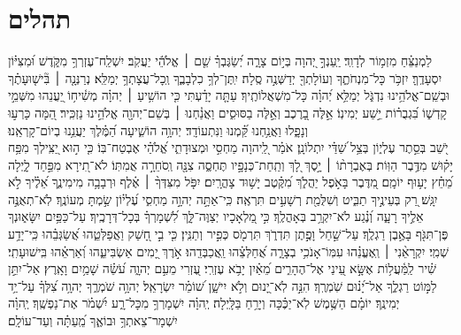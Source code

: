 \documentclass[a4paper, twoside, openany, parskip=half, 10pt]{article}
\begin{document}
\section{תהלים}

לַמְנַצֵּ֗חַ מִזְמ֥וֹר לְדָוִֽד׃
יַֽעַנְךָ֣ יְ֭הוָה בְּי֣וֹם צָרָ֑ה יְ֝שַׂגֶּבְךָ֗ שֵׁ֤ם ׀ אֱלֹהֵ֬י יַעֲקֹֽב׃
יִשְׁלַֽח־עֶזְרְךָ֥ מִקֹּ֑דֶשׁ וּ֝מִצִּיּ֗וֹן יִסְעָדֶֽךָּ׃
יִזְכֹּ֥ר כָּל־מִנְחֹתֶ֑ךָ וְעוֹלָתְךָ֖ יְדַשְּׁנֶ֣ה סֶֽלָה׃
יִֽתֶּן־לְךָ֥ כִלְבָבֶ֑ךָ וְֽכָל־עֲצָתְךָ֥ יְמַלֵּֽא׃
נְרַנְּנָ֤ה ׀ בִּ֘ישׁ֤וּעָתֶ֗ךָ וּבְשֵֽׁם־אֱלֹהֵ֥ינוּ נִדְגֹּ֑ל יְמַלֵּ֥א יְ֝הוָ֗ה כָּל־מִשְׁאֲלוֹתֶֽיךָ׃
עַתָּ֤ה יָדַ֗עְתִּי כִּ֤י הוֹשִׁ֥יעַ ׀ יְהוָ֗ה מְשִׁ֫יח֥וֹ יַ֭עֲנֵהוּ מִשְּׁמֵ֣י קָדְשׁ֑וֹ בִּ֝גְבֻר֗וֹת יֵ֣שַׁע יְמִינֽוֹ׃
אֵ֣לֶּה בָ֭רֶכֶב וְאֵ֣לֶּה בַסּוּסִ֑ים וַאֲנַ֓חְנוּ ׀ בְּשֵׁם־יְהוָ֖ה אֱלֹהֵ֣ינוּ נַזְכִּֽיר׃
הֵ֭מָּה כָּרְע֣וּ וְנָפָ֑לוּ וַאֲנַ֥חְנוּ קַּ֝֗מְנוּ וַנִּתְעוֹדָֽד׃
יְהוָ֥ה הוֹשִׁ֑יעָה הַ֝מֶּ֗לֶךְ יַעֲנֵ֥נוּ בְיוֹם־קָרְאֵֽנוּ׃\\

יֹ֭שֵׁב בְּסֵ֣תֶר עֶלְי֑וֹן בְּצֵ֥ל שַׁ֝דַּ֗י יִתְלוֹנָֽן׃
אֹמַ֗ר לַֽ֭יהוָה מַחְסִ֣י וּמְצוּדָתִ֑י אֱ֝לֹהַ֗י אֶבְטַח־בּֽוֹ׃
כִּ֤י ה֣וּא יַ֭צִּֽילְךָ מִפַּ֥ח יָק֗וּשׁ מִדֶּ֥בֶר הַוּֽוֹת׃
בְּאֶבְרָת֨וֹ ׀ יָ֣סֶךְ לָ֭ךְ וְתַֽחַת־כְּנָפָ֣יו תֶּחְסֶ֑ה צִנָּ֖ה וְֽסֹחֵרָ֣ה אֲמִתּֽוֹ׃
לֹא־תִ֭ירָא מִפַּ֣חַד לָ֑יְלָה מֵ֝חֵ֗ץ יָע֥וּף יוֹמָֽם׃
מִ֭דֶּבֶר בָּאֹ֣פֶל יַהֲלֹ֑ךְ מִ֝קֶּ֗טֶב יָשׁ֥וּד צָהֳרָֽיִם׃
יִפֹּ֤ל מִצִּדְּךָ֨ ׀ אֶ֗לֶף וּרְבָבָ֥ה מִימִינֶ֑ךָ אֵ֝לֶ֗יךָ לֹ֣א יִגָּֽשׁ׃
רַ֭ק בְּעֵינֶ֣יךָ תַבִּ֑יט וְשִׁלֻּמַ֖ת רְשָׁעִ֣ים תִּרְאֶֽה׃
כִּֽי־אַתָּ֣ה יְהוָ֣ה מַחְסִ֑י עֶ֝לְי֗וֹן שַׂ֣מְתָּ מְעוֹנֶֽךָ׃
לֹֽא־תְאֻנֶּ֣ה אֵלֶ֣יךָ רָעָ֑ה וְ֝נֶ֗גַע לֹא־יִקְרַ֥ב בְּאָהֳלֶֽךָ׃
כִּ֣י מַ֭לְאָכָיו יְצַוֶּה־לָּ֑ךְ לִ֝שְׁמָרְךָ֗ בְּכָל־דְּרָכֶֽיךָ׃
עַל־כַּפַּ֥יִם יִשָּׂא֑וּנְךָ פֶּן־תִּגֹּ֖ף בָּאֶ֣בֶן רַגְלֶֽךָ׃
עַל־שַׁ֣חַל וָפֶ֣תֶן תִּדְרֹ֑ךְ תִּרְמֹ֖ס כְּפִ֣יר וְתַנִּֽין׃
כִּ֤י בִ֣י חָ֭שַׁק וַאֲפַלְּטֵ֑הוּ אֲ֝שַׂגְּבֵ֗הוּ כִּֽי־יָדַ֥ע שְׁמִֽי׃
יִקְרָאֵ֨נִי ׀ וְֽאֶעֱנֵ֗הוּ עִמּֽוֹ־אָנֹכִ֥י בְצָרָ֑ה אֲ֝חַלְּצֵ֗הוּ וַֽאֲכַבְּדֵֽהוּ׃
אֹ֣רֶךְ יָ֭מִים אַשְׂבִּיעֵ֑הוּ וְ֝אַרְאֵ֗הוּ בִּֽישׁוּעָתִֽי׃\\

שִׁ֗יר לַֽמַּ֫עֲל֥וֹת אֶשָּׂ֣א עֵ֭ינַי אֶל־הֶהָרִ֑ים מֵ֝אַ֗יִן יָבֹ֥א עֶזְרִֽי׃
עֶ֭זְרִי מֵעִ֣ם יְהוָ֑ה עֹ֝שֵׂ֗ה שָׁמַ֥יִם וָאָֽרֶץ׃
אַל־יִתֵּ֣ן לַמּ֣וֹט רַגְלֶ֑ךָ אַל־יָ֝נ֗וּם שֹֽׁמְרֶֽךָ׃
הִנֵּ֣ה לֹֽא־יָ֭נוּם וְלֹ֣א יִישָׁ֑ן שׁ֝וֹמֵ֗ר יִשְׂרָאֵֽל׃
יְהוָ֥ה שֹׁמְרֶ֑ךָ יְהוָ֥ה צִ֝לְּךָ֗ עַל־יַ֥ד יְמִינֶֽךָ׃
יוֹמָ֗ם הַשֶּׁ֥מֶשׁ לֹֽא־יַכֶּ֗כָּה וְיָרֵ֥חַ בַּלָּֽיְלָה׃
יְֽהוָ֗ה יִשְׁמָרְךָ֥ מִכָּל־רָ֑ע יִ֝שְׁמֹ֗ר אֶת־נַפְשֶֽׁךָ׃
יְֽהוָ֗ה יִשְׁמָר־צֵאתְךָ֥ וּבוֹאֶ֑ךָ מֵֽ֝עַתָּ֗ה וְעַד־עוֹלָֽם׃\\
\end{document}
